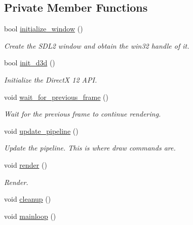 \subsection*{Private Member Functions}
\begin{DoxyCompactItemize}
\item 
bool \mbox{\hyperlink{classd3dx12__application_a97243eddb3d0590da534807dc6c7869c}{initialize\+\_\+window}} ()
\begin{DoxyCompactList}\small\item\em Create the S\+D\+L2 window and obtain the win32 handle of it. \end{DoxyCompactList}\item 
bool \mbox{\hyperlink{classd3dx12__application_a6edf0fc7ee64b654e85201c6600de712}{init\+\_\+d3d}} ()
\begin{DoxyCompactList}\small\item\em Initialize the DirectX 12 A\+PI. \end{DoxyCompactList}\item 
void \mbox{\hyperlink{classd3dx12__application_ab229777796514cc833d878416ba88ff6}{wait\+\_\+for\+\_\+previous\+\_\+frame}} ()
\begin{DoxyCompactList}\small\item\em Wait for the previous frame to continue rendering. \end{DoxyCompactList}\item 
void \mbox{\hyperlink{classd3dx12__application_a32f96cc36815978e294e58eaaa1d4a79}{update\+\_\+pipeline}} ()
\begin{DoxyCompactList}\small\item\em Update the pipeline. This is where draw commands are. \end{DoxyCompactList}\item 
void \mbox{\hyperlink{classd3dx12__application_a5d5a6a27cf79f7de39c01431d27b8a64}{render}} ()
\begin{DoxyCompactList}\small\item\em Render. \end{DoxyCompactList}\item 
void \mbox{\hyperlink{classd3dx12__application_a47fa5a8d1975c52b9b9531e602b8da6a}{cleanup}} ()
\item 
void \mbox{\hyperlink{classd3dx12__application_af8acf4cd1008650390012b4429dda668}{mainloop}} ()
\end{DoxyCompactItemize}
